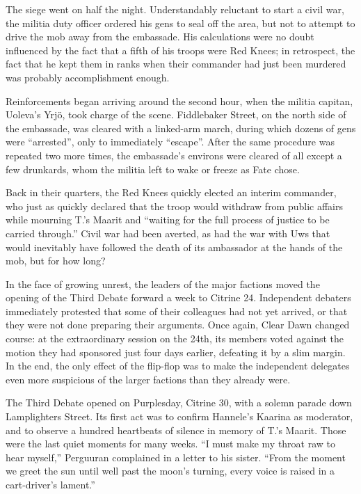 \documentclass[12pt]{report}
\begin{document}
The siege went on half the night.  Understandably reluctant to start a
civil war, the militia duty officer ordered his gens to seal off the
area, but not to attempt to drive the mob away from the embassade.
His calculations were no doubt influenced by the fact that a fifth of
his troops were Red Knees; in retrospect, the fact that he kept them
in ranks when their commander had just been murdered was probably
accomplishment enough.

Reinforcements began arriving around the second hour, when the militia
capitan, Uoleva's Yrj\"{o}, took charge of the scene.  Fiddlebaker
Street, on the north side of the embassade, was cleared with a
linked-arm march, during which dozens of gens were ``arrested'', only to
immediately ``escape''.  After the same procedure was repeated two more
times, the embassade's environs were cleared of all except a few
drunkards, whom the militia left to wake or freeze as Fate chose.

Back in their quarters, the Red Knees quickly elected an interim
commander, who just as quickly declared that the troop would withdraw
from public affairs while mourning T.'s Maarit and ``waiting for the
full process of justice to be carried through.''  Civil war had been
averted, as had the war with Uws that would inevitably have followed
the death of its ambassador at the hands of the mob, but for how long?

In the face of growing unrest, the leaders of the major factions moved
the opening of the Third Debate forward a week to Citrine 24.
Independent debaters immediately protested that some of their
colleagues had not yet arrived, or that they were not done preparing
their arguments.  Once again, Clear Dawn changed course: at the
extraordinary session on the 24th, its members voted against the
motion they had sponsored just four days earlier, defeating it by a
slim margin.  In the end, the only effect of the flip-flop was to make
the independent delegates even more suspicious of the larger factions
than they already were.

The Third Debate opened on Purplesday, Citrine 30, with a solemn
parade down Lamplighters Street.  Its first act was to confirm
Hannele's Kaarina as moderator, and to observe a hundred heartbeats of
silence in memory of T.'s Maarit.  Those were the last quiet moments
for many weeks.  ``I must make my throat raw to hear myself,'' Perguuran
complained in a letter to his sister.  ``From the moment we greet the
sun until well past the moon's turning, every voice is raised in a
cart-driver's lament.''
\end{document}
